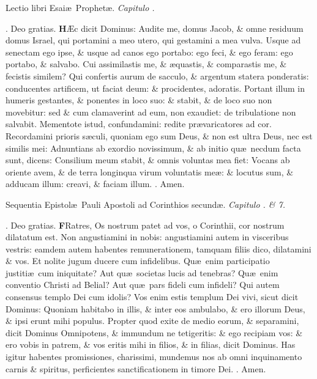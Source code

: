 \documentclass[letter,11pt]{book}
\makeatletter
\DeclareRobustCommand{\Rbar}{\vers@resp{0pt}{R}}
\newcommand{\vers@resp@sym}{\raisebox{0.2ex}{\rotatebox[origin=c]{-20}{$\m@th\rceil$}}}
\newcommand{\vers@resp}[2]{%
  {\ooalign{\hidewidth\kern#1\vers@resp@sym\hidewidth\cr#2\cr}}%
}%
\def\R{\color{Red} \Rbar . \color{black}}
\makeatother
\begin{document}
\begin{multicols*}{2}
\vspace{-1.5em} \begin{center} {\color{Red} L}ectio libri Esai\ae \ Prophet\ae . \itshape Capitulo . \color{black} \end{center} \vspace{-.5em}
\par \noindent \R Deo gratias.
\lettrine[lines=2]{\bfseries \color{Red} H}{}\AE c dicit Dominus: Audite me, domus Jacob, \& omne residuum domus Israel, qui portamini a meo utero, qui gestamini a mea vulva. Usque ad senectam ego ipse, \& usque ad canos ego portabo: ego feci, \& ego feram: ego portabo, \& salvabo. Cui assimilastis me, \& \ae quastis, \& comparastis me, \& fecistis similem? Qui confertis aurum de sacculo, \& argentum statera ponderatis: conducentes artificem, ut faciat deum: \& procidentes, adoratis. Portant illum in humeris gestantes, \& ponentes in loco suo: \& stabit, \& de loco suo non movebitur: sed \& cum clamaverint ad eum, non exaudiet: de tribulatione non salvabit. Mementote istud, confundamini: redite pr\ae varicatores ad cor. Recordamini prioris s\ae culi, quoniam ego sum Deus, \& non est ultra Deus, nec est similis mei: Adnuntians ab exordio novissimum, \& ab initio qu\ae \ necdum facta sunt, dicens: Consilium meum stabit, \& omnis voluntas mea fiet: Vocans ab oriente avem, \& de terra longinqua virum voluntatis me\ae : \& locutus sum, \& adducam illum: creavi, \& faciam illum. \R Amen.
\vspace{-.5em} \begin{center} {\color{Red} S}equentia Epistol\ae \ Pauli Apostoli ad Corinthios secund\ae . \itshape Capitulo . \& 7. \color{black} \end{center} \vspace{-.5em}
\par \noindent \R Deo gratias.
\lettrine[lines=2]{\bfseries \color{Red} F}{}Ratres, Os nostrum patet ad vos, o Corinthii, cor nostrum dilatatum est. Non angustiamini in nobis: angustiamini autem in visceribus vestris: eamdem autem habentes remunerationem, tamquam filiis dico, dilatamini \& vos. Et nolite jugum ducere cum infidelibus. Qu\ae \ enim participatio justiti\ae \ cum iniquitate? Aut qu\ae \ societas lucis ad tenebras? Qu\ae \ enim conventio Christi ad Belial? Aut qu\ae \ pars fideli cum infideli? Qui autem consensus templo Dei cum idolis? Vos enim estis templum Dei vivi, sicut dicit Dominus: Quoniam habitabo in illis, \& inter eos ambulabo, \& ero illorum Deus, \& ipsi erunt mihi populus. Propter quod exite de medio eorum, \& separamini, dicit Dominus Omnipotens, \& immundum ne tetigeritis: \& ego recipiam vos: \& ero vobis in patrem, \& vos eritis mihi in filios, \& in filias, dicit Dominus. Has igitur habentes promissiones, charissimi, mundemus nos ab omni inquinamento carnis \& spiritus, perficientes sanctificationem in timore Dei. \R Amen.

\end{multicols*}
\end{document}
